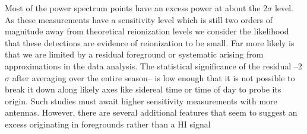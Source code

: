 \documentclass[preprint2]{aastex}
\begin{document}
Most of the power spectrum points have an excess power at about the 2$\sigma$ level.  As these measurements have a sensitivity level which is still two orders of magnitude away from theoretical reionization levels we consider the likelihood that these detections are evidence of reionization to be small. Far more likely is that we are limited by a residual foreground or systematic arising from approximations in the data analysis.  The statistical significance of the residual --2$\sigma$ after averaging over the entire season-- is low enough that it is not possible to break it down along likely axes like sidereal time or time of day to probe its origin.  Such studies must await higher sensitivity measurements with more antennas.  However, there are several additional features that seem to suggest an excess originating in foregrounds rather than a HI signal



\end{document}
